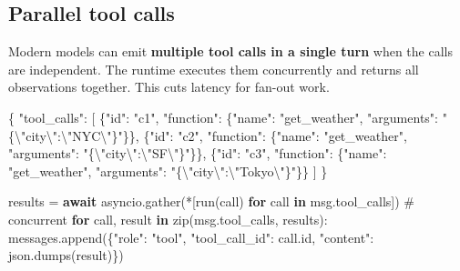 \documentclass[11pt]{article}
\newenvironment{Shaded}{\begin{snugshade}}{\end{snugshade}}
\newcommand{\BuiltInTok}[1]{\textcolor[rgb]{0.50,0.55,0.55}{#1}}
\newcommand{\CharTok}[1]{\textcolor[rgb]{0.24,0.68,0.91}{#1}}
\newcommand{\CommentTok}[1]{\textcolor[rgb]{0.48,0.49,0.49}{#1}}
\newcommand{\ControlFlowTok}[1]{\textcolor[rgb]{0.99,0.74,0.29}{\textbf{#1}}}
\newcommand{\DataTypeTok}[1]{\textcolor[rgb]{0.16,0.50,0.73}{#1}}
\newcommand{\FunctionTok}[1]{\textcolor[rgb]{0.56,0.27,0.68}{#1}}
\newcommand{\KeywordTok}[1]{\textcolor[rgb]{0.81,0.81,0.76}{\textbf{#1}}}
\newcommand{\NormalTok}[1]{\textcolor[rgb]{0.81,0.81,0.76}{#1}}
\newcommand{\OperatorTok}[1]{\textcolor[rgb]{0.81,0.81,0.76}{#1}}
\newcommand{\OtherTok}[1]{\textcolor[rgb]{0.15,0.68,0.38}{#1}}
\newcommand{\StringTok}[1]{\textcolor[rgb]{0.96,0.31,0.31}{#1}}
\begin{document}
\subsection{Parallel tool calls}\label{parallel-tool-calls}

Modern models can emit \textbf{multiple tool calls in a single turn} when the calls are independent. The runtime executes them concurrently and returns all observations together. This cuts latency for fan-out work.


\begin{Shaded}
\begin{Highlighting}[]
\FunctionTok{\{}
  \DataTypeTok{"tool\_calls"}\FunctionTok{:} \OtherTok{[}
    \FunctionTok{\{}\DataTypeTok{"id"}\FunctionTok{:} \StringTok{"c1"}\FunctionTok{,} \DataTypeTok{"function"}\FunctionTok{:} \FunctionTok{\{}\DataTypeTok{"name"}\FunctionTok{:} \StringTok{"get\_weather"}\FunctionTok{,} \DataTypeTok{"arguments"}\FunctionTok{:} \StringTok{"\{}\CharTok{\textbackslash{}"}\StringTok{city}\CharTok{\textbackslash{}"}\StringTok{:}\CharTok{\textbackslash{}"}\StringTok{NYC}\CharTok{\textbackslash{}"}\StringTok{\}"}\FunctionTok{\}\}}\OtherTok{,}
    \FunctionTok{\{}\DataTypeTok{"id"}\FunctionTok{:} \StringTok{"c2"}\FunctionTok{,} \DataTypeTok{"function"}\FunctionTok{:} \FunctionTok{\{}\DataTypeTok{"name"}\FunctionTok{:} \StringTok{"get\_weather"}\FunctionTok{,} \DataTypeTok{"arguments"}\FunctionTok{:} \StringTok{"\{}\CharTok{\textbackslash{}"}\StringTok{city}\CharTok{\textbackslash{}"}\StringTok{:}\CharTok{\textbackslash{}"}\StringTok{SF}\CharTok{\textbackslash{}"}\StringTok{\}"}\FunctionTok{\}\}}\OtherTok{,}
    \FunctionTok{\{}\DataTypeTok{"id"}\FunctionTok{:} \StringTok{"c3"}\FunctionTok{,} \DataTypeTok{"function"}\FunctionTok{:} \FunctionTok{\{}\DataTypeTok{"name"}\FunctionTok{:} \StringTok{"get\_weather"}\FunctionTok{,} \DataTypeTok{"arguments"}\FunctionTok{:} \StringTok{"\{}\CharTok{\textbackslash{}"}\StringTok{city}\CharTok{\textbackslash{}"}\StringTok{:}\CharTok{\textbackslash{}"}\StringTok{Tokyo}\CharTok{\textbackslash{}"}\StringTok{\}"}\FunctionTok{\}\}}
  \OtherTok{]}
\FunctionTok{\}}
\end{Highlighting}
\end{Shaded}


\begin{Shaded}
\begin{Highlighting}[]
\NormalTok{results }\OperatorTok{=} \ControlFlowTok{await}\NormalTok{ asyncio.gather(}\OperatorTok{*}\NormalTok{[run(call) }\ControlFlowTok{for}\NormalTok{ call }\KeywordTok{in}\NormalTok{ msg.tool\_calls])  }\CommentTok{\# concurrent}
\ControlFlowTok{for}\NormalTok{ call, result }\KeywordTok{in} \BuiltInTok{zip}\NormalTok{(msg.tool\_calls, results):}
\NormalTok{    messages.append(\{}\StringTok{"role"}\NormalTok{: }\StringTok{"tool"}\NormalTok{, }\StringTok{"tool\_call\_id"}\NormalTok{: call.}\BuiltInTok{id}\NormalTok{, }\StringTok{"content"}\NormalTok{: json.dumps(result)\})}
\end{Highlighting}
\end{Shaded}
\end{document}
